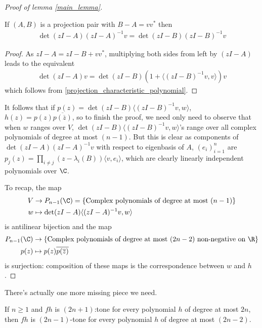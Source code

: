 \begin{proof}[Proof of lemma \ref{main_lemma}]
	\begin{lem}
		If $(A, B)$ is a projection pair with $B - A = v v^{*}$ then
		\begin{align*}
			\det(z I - A) (z I - A)^{-1} v = \det(z I - B) (z I - B)^{-1} v
		\end{align*} 
	\end{lem}
	\begin{proof}
		As $z I - A = z I - B + v v^{*}$, multiplying both sides from left by $(z I - A)$ leads to the equivalent
		\begin{align*}
			\det(z I - A) v = \det(z I - B) (1 + \langle (z I - B)^{-1} v, v \rangle) v
		\end{align*}
		which follows from \ref{projection_characteristic_polynomial}.
	\end{proof}
	It follows that if $p(z) = \det(z I - B) \langle (z I - B)^{-1} v, w \rangle$, $h(z) = p(z) \overline{p (\overline{z})}$, so to finish the proof, we need only need to observe that when $w$ ranges over $V$, $\det(z I - B) \langle (z I - B)^{-1} v, w \rangle$'s range over all complex polynomials of degree at most $(n - 1)$. But this is clear as components of $\det(z I - A)(z I - A)^{-1} v$ with respect to eigenbasis of $A$, $(e_{i})_{i = 1}^{n}$ are $p_{j}(z) = \prod_{i \neq j}(z - \lambda_{i}(B)) \langle v, e_{i} \rangle$, which are clearly linearly independent polynomials over $\C$.

	To recap, the map
	\begin{align*}
		V &\to P_{n - 1}(\C) = \{\text{Complex polynomials of degree at most } (n - 1) \} \\
		w &\mapsto \det(z I - A) \langle (z I - A)^{-1} v, w \rangle
	\end{align*}
	is antilinear bijection and the map
	\begin{align*}
		P_{n - 1}(\C) &\to \{\text{Complex polynomials of degree at most } (2 n - 2) \text{ non-negative on } \R \} \\
		p(z) &\mapsto p(z) \overline{p(\overline{z})}
	\end{align*}
	is surjection: composition of these maps is the correspondence between $w$ and $h$.
\end{proof}

There's actually one more missing piece we need.

\begin{lem}\label{k_tone_cor}
	If $n \geq 1$ and $f h$ is $(2 n + 1)$:tone for every polynomial $h$ of degree at most $2 n$, then $f h$ is $(2 n - 1)$-tone for every polynomial $h$ of degree at most $(2 n - 2)$.
\end{lem}

